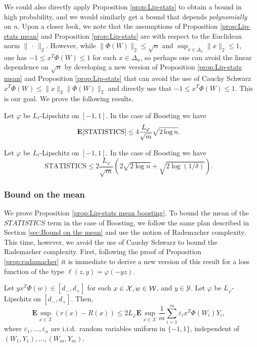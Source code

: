 We could also directly apply Proposition \ref{prop:Lip-stats} to obtain a bound in high probability, and we would similarly get a bound that depends \emph{polynomially} on $n$. Upon a closer look, we note that the assumptions of Proposition \ref{prop:Lip-stats mean} and Proposition \ref{prop:Lip-stats} are with respect to the Euclidean norm $\|\,\cdot\,\|_2$. However, while $\|\Phi(W)\|_2\le \sqrt{n}$ and $\sup_{x\in\Delta_n}\|x\|_2 \le 1$, one has $-1 \le x^T\Phi(W) \le 1$ for each $x\in\Delta_n$, so perhaps one can avoid the linear dependence on $\sqrt{n}$ by developing a new version of Proposition \ref{prop:Lip-stats mean} and Proposition \ref{prop:Lip-stats} that can avoid the use of Cauchy Schwarz $x^T\Phi(W)\le \|x\|_2\|\Phi(W)\|_2$ and directly use that $-1 \le x^T\Phi(W) \le 1$. This is our goal. We prove the following results.

\begin{proposition}[Mean]
\label{prop:Lip-stats mean boosting}
Let $\varphi$ be $L_\ell$-Lipschitz on $[-1,1]$. In the case of Boosting we have
$$
	\mathbf{E}[\textrm{STATISTICS}] 
	\le 4 \frac{L_\varphi}{\sqrt{m}}  \sqrt{2\log n}.
$$
\end{proposition}

\begin{proposition}
\label{prop:Lip-stats boosting}
Let $\varphi$ be $L_\ell$-Lipschitz on $[-1,1]$. In the case of Boosting we have
$$
	\textrm{STATISTICS} 
	\le 2\frac{L_\varphi}{\sqrt{m}}(2\sqrt{2\log n} + \sqrt{2\log(1/\delta)}).
$$
\end{proposition}

\subsubsection{Bound on the mean}
We prove Proposition \ref{prop:Lip-stats mean boosting}. To bound the mean of the $STATISTICS$ term in the case of Boosting, we follow the same plan described in Section \ref{sec:Bound on the mean} and use the notion of Rademacher complexity. This time, however, we avoid the use of Cauchy Schwarz to bound the Rademacher complexity. First, following the proof of Proposition \ref{prop:radamacher} it is immediate to derive a new version of this result for a loss function of the type $\ell(z,y)=\varphi(-yz)$.
\begin{proposition}
\label{prop:radamacherBoosting}
Let $yx^T\Phi(w) \in [d_-,d_+]$ for each $x\in\mathcal{X},w\in\mathcal{W}$, and $y\in \mathcal{Y}$. Let $\varphi$ be $L_\varphi$-Lipschitz on $[d_-,d_+]$. Then,
$$
	\mathbf{E}\sup_{x\in\mathcal{X}} ( r(x) - R(x) )
	\le
	2L_\varphi\mathbf{E} \sup_{x\in\mathcal{X}} \frac{1}{m}\sum_{i=1}^m\varepsilon_i x^T\Phi(W_i)Y_i,
$$
where $\varepsilon_1,\ldots,\varepsilon_n$ are i.i.d.\ random variables uniform in $\{-1,1\}$, independent of $(W_1,Y_1),\ldots,(W_m,Y_m)$.
\end{proposition}

